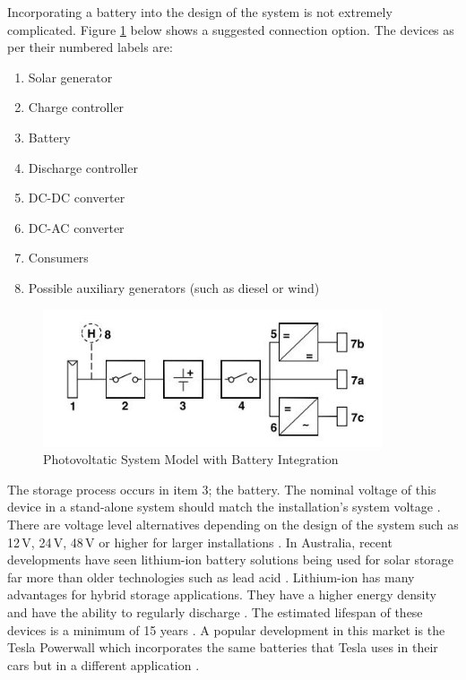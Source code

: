 Incorporating a battery into the design of the system is not extremely complicated. Figure \ref{fig:pv-connection-layouts} below shows a suggested connection option. The devices as per their numbered labels are:

\begin{enumerate}[noitemsep]
	\item Solar generator
	\item Charge controller	
	\item Battery
	\item Discharge controller
	\item DC-DC converter
	\item DC-AC converter
	\item Consumers
	\item Possible auxiliary generators (such as diesel or wind)
\end{enumerate}

\begin{figure}[H]
	\hfill\includegraphics[width = 100mm] {images/pv-system-layout}\hspace*{\fill}
	\caption{Photovoltatic System Model with Battery Integration \cite{Haberlin2012}}
	\label{fig:pv-connection-layouts}
\end{figure} 

The storage process occurs in item 3; the battery. The nominal voltage of this device in a stand-alone system should match the installation's system voltage \cite{Haberlin2012}. There are voltage level alternatives depending on the design of the system such as 12\,V, 24\,V, 48\,V or higher for larger installations \cite{Haberlin2012}. In Australia, recent developments have seen lithium-ion battery solutions being used for solar storage far more than older technologies such as lead acid \cite{website:OffGridEnergy1}. Lithium-ion has many advantages for hybrid storage applications. They have a higher energy density and have the ability to regularly discharge \cite{website:OffGridEnergy1}. The estimated lifespan of these devices is a minimum of 15 years \cite{website:OffGridEnergy1}. A popular development in this market is the Tesla Powerwall which incorporates the same batteries that Tesla uses in their cars but in a different application \cite{Tesla1}.  


